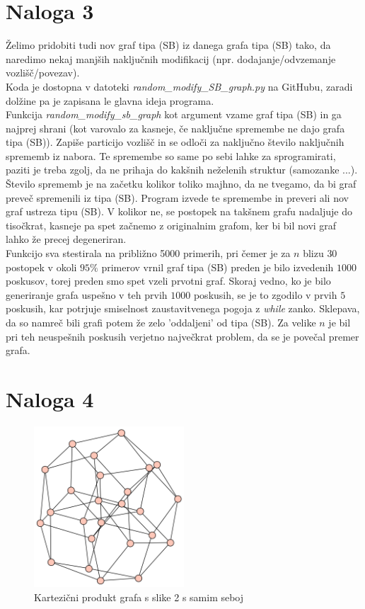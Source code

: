 \documentclass{article}
\begin{document}
\section{Naloga 3}

Želimo pridobiti tudi nov graf tipa (SB) iz danega grafa tipa (SB) tako, 
da naredimo nekaj manjših naključnih modifikacij (npr. dodajanje/odvzemanje 
vozlišč/povezav). 
\\
Koda je dostopna v datoteki \textit{random\_modify\_SB\_graph.py} na GitHubu, zaradi 
dolžine pa je zapisana le glavna ideja programa. 
\\Funkcija \textit{random\_modify\_sb\_graph} kot argument vzame graf tipa (SB) in 
ga najprej shrani (kot varovalo za kasneje, če naključne spremembe ne dajo 
grafa tipa (SB)). Zapiše particijo vozlišč in se odloči za naključno število 
naključnih sprememb iz nabora. Te spremembe so same po sebi lahke za sprogramirati, paziti 
je treba zgolj, da ne prihaja do kakšnih neželenih struktur (samozanke ...). Število sprememb je na začetku kolikor toliko majhno, da ne tvegamo,
da bi graf preveč spremenili iz tipa (SB). Program izvede te spremembe in preveri ali nov graf ustreza tipu (SB).
V kolikor ne, se postopek na takšnem grafu nadaljuje do tisočkrat, kasneje pa 
spet začnemo z originalnim grafom, ker bi bil novi graf lahko že precej degeneriran.
\\
Funkcijo sva stestirala na približno 5000 primerih, pri čemer je za $n$ blizu $30$ postopek 
v okoli $95 \%$ primerov vrnil graf tipa (SB) preden je bilo izvedenih $1000$ poskusov, torej preden smo  
spet vzeli prvotni graf. Skoraj vedno, ko je bilo generiranje grafa uspešno v teh prvih $1000$ poskusih,
se je to zgodilo v prvih $5$ poskusih, kar potrjuje smiselnost zaustavitvenega pogoja z \emph{while} zanko.
Sklepava, da so namreč bili grafi potem že zelo 'oddaljeni' od tipa (SB). Za velike $n$ je bil pri teh neuspešnih 
poskusih verjetno največkrat problem, da se je povečal premer grafa.

\section{Naloga 4}


\begin{figure}[h!]
    \centering
    \includegraphics[width=0.5\textwidth]{sb_min_cartesian_example.png} %
    \caption{Kartezični produkt grafa s slike 2 s samim seboj}
    
\end{figure}
\end{document}
